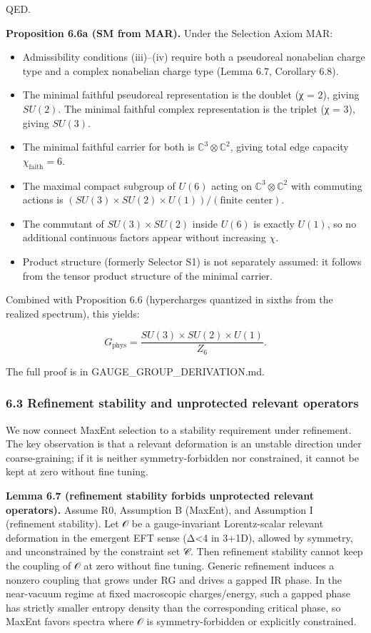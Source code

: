 \documentclass[
]{article}
\providecommand{\tightlist}{%
  \setlength{\itemsep}{0pt}\setlength{\parskip}{0pt}}
\begin{document}
QED.

\textbf{Proposition 6.6a (SM from MAR).} Under the Selection Axiom MAR:

\begin{itemize}
\tightlist
\item
  Admissibility conditions (iii)--(iv) require both a pseudoreal
  nonabelian charge type and a complex nonabelian charge type (Lemma
  6.7, Corollary 6.8).
\item
  The minimal faithful pseudoreal representation is the doublet (χ = 2),
  giving \(SU(2)\). The minimal faithful complex representation is the
  triplet (χ = 3), giving \(SU(3)\).
\item
  The minimal faithful carrier for both is
  \(\mathbb{C}^3 \otimes \mathbb{C}^2\), giving total edge capacity
  \(\chi_{\mathrm{faith}} = 6\).
\item
  The maximal compact subgroup of \(U(6)\) acting on
  \(\mathbb{C}^3 \otimes \mathbb{C}^2\) with commuting actions is
  \((SU(3) \times SU(2) \times U(1))/(\text{finite center})\).
\item
  The commutant of \(SU(3) \times SU(2)\) inside \(U(6)\) is exactly
  \(U(1)\), so no additional continuous factors appear without
  increasing \(\chi\).
\item
  Product structure (formerly Selector S1) is not separately assumed: it
  follows from the tensor product structure of the minimal carrier.
\end{itemize}

Combined with Proposition 6.6 (hypercharges quantized in sixths from the
realized spectrum), this yields:

\[
G_{\mathrm{phys}} = \frac{SU(3) \times SU(2) \times U(1)}{Z_6}.
\]

The full proof is in GAUGE\_GROUP\_DERIVATION.md.

\subsubsection{6.3 Refinement stability and unprotected relevant
operators}\label{refinement-stability-and-unprotected-relevant-operators}

We now connect MaxEnt selection to a stability requirement under
refinement. The key observation is that a relevant deformation is an
unstable direction under coarse-graining; if it is neither
symmetry-forbidden nor constrained, it cannot be kept at zero without
fine tuning.

\textbf{Lemma 6.7 (refinement stability forbids unprotected relevant
operators).} Assume R0, Assumption B (MaxEnt), and Assumption I
(refinement stability). Let 𝒪 be a gauge-invariant Lorentz-scalar
relevant deformation in the emergent EFT sense (Δ\textless4 in 3+1D),
allowed by symmetry, and unconstrained by the constraint set 𝒞. Then
refinement stability cannot keep the coupling of 𝒪 at zero without fine
tuning. Generic refinement induces a nonzero coupling that grows under
RG and drives a gapped IR phase. In the near-vacuum regime at fixed
macroscopic charges/energy, such a gapped phase has strictly smaller
entropy density than the corresponding critical phase, so MaxEnt favors
spectra where 𝒪 is symmetry-forbidden or explicitly constrained.
\end{document}
